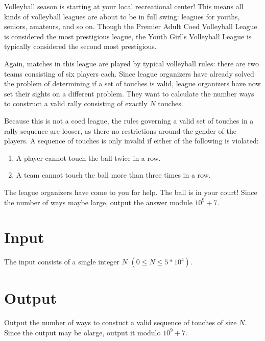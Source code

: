 
Volleyball season is starting at your local recreational center! This means all kinds of volleyball
leagues are about to be in full swing: leagues for youths, seniors, amateurs, and so on. Though the
Premier Adult Coed Volleyball League is considered the most prestigious league, the Youth Girl's
Volleyball League is typically considered the second most prestigious.

Again, matches in this league are played by typical volleyball rules: there are two teams consisting of six
players each. Since league organizers have already solved the problem of determining if a set of touches is
valid, league organizers have now set their sights on a different problem. They want to
calculate the number ways to construct a valid rally consisting of exactly $N$ touches.

Because this is not a coed league, the rules governing a valid set of touches in a rally sequence 
are looser, as there no restrictions around the gender of the players. A sequence of touches is only invalid
if either of the following is violated:

\begin{enumerate}
    \item A player cannot touch the ball twice in a row.
    \item A team cannot touch the ball more than three times in a row.
\end{enumerate}

The league organizers have come to you for help. The ball is in your court! Since the number of ways
maybe large, output the answer module $10^9 + 7$.

\section*{Input}

The input consists of a single integer $N$ $(0 \leq N \leq 5 * 10^4)$.

\section*{Output}

Output the number of ways to constuct a valid sequence of touches of size $N$. Since the output may be
olarge, output it modulo $10^9 + 7$.
